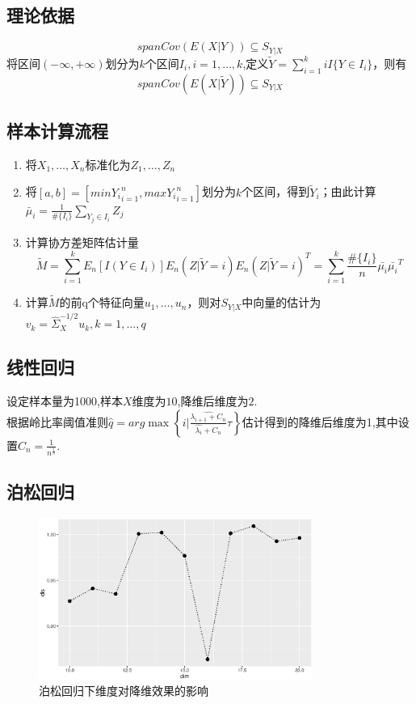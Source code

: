 \subsection{理论依据}
    \begin{equation*}
        span{Cov(E(X|Y))}\subseteq S_{Y|X}
    \end{equation*}
    将区间$(-\infty,+\infty)$划分为$k$个区间$I_i, i=1,\dots,k$,定义$\widetilde{Y}=\sum_{i=1}^kiI\{Y\in I_i\}$，则有
    \begin{equation*}
        span{Cov(E(X|\widetilde{Y}))}\subseteq S_{Y|X}
    \end{equation*}
\subsection{样本计算流程}
    \begin{enumerate}
        \item 将$X_1,\dots,X_n$标准化为$Z_1,\dots,Z_n$
        \item 将$[a,b]=[min{Y_i}_{i=1}^n,max{Y_i}_{i=1}^n]$划分为$k$个区间，得到$\widetilde{Y}_i$；由此计算$\bar{\mu}_i=\frac{1}{\#\{I_i\}}\sum_{Y_j\in I_i}Z_j$
        \item 计算协方差矩阵估计量$$\widetilde{M}=\sum_{i=1}^kE_n[I(Y\in I_i)] E_n(Z|\widetilde{Y}=i) E_n(Z|\widetilde{Y}=i)^T=\sum_{i=1}^k\frac{\#\{I_i\}}{n}\bar{\mu_i}\bar{\mu_i}^T$$
        \item 计算$\widetilde{M}$的前q个特征向量$u_1,\dots,u_n$，则对$S_{Y|X}$中向量的估计为$v_k=\hat{\Sigma}_{X}^{-1/2}u_k,k=1,\dots,q$
    \end{enumerate}

\subsection{线性回归}
    设定样本量为1000,样本$X$维度为$10$,降维后维度为$2$.\\
    根据岭比率阈值准则$\hat{q} = arg\max\left\{i|\frac{\hat{\lambda_{i+1}+C_n}}{\hat{\lambda_i}+C_n}\tau\right\}$估计得到的降维后维度为1,其中设置$C_n = \frac{1}{n^\frac{1}{3} }$.

    
    
\subsection{泊松回归}
    \begin{figure}[htbp]
        \centering
        \includegraphics[width=0.8\textwidth]{image/pois_sir.eps}
        \caption{泊松回归下维度对降维效果的影响}
    \end{figure}
    

